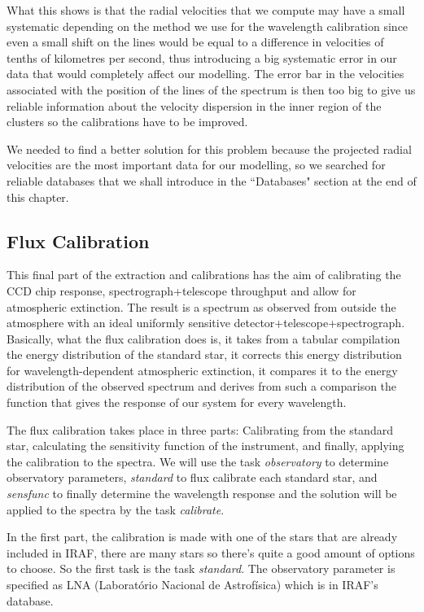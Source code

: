 What this shows is that the radial velocities that we compute may have a small systematic depending on the method we use for the wavelength calibration since even a small shift on the lines would be equal to a difference in velocities of tenths of kilometres per second, thus introducing a big systematic error in our data that would completely affect our modelling. The error bar in the velocities associated with the position of the lines of the spectrum is then too big to give us reliable information about the velocity dispersion in the inner region of the clusters so the calibrations have to be improved.

We needed to find a better solution for this problem because the projected radial velocities are the most important data for our modelling, so we searched for reliable databases that we shall introduce in the ``Databases" section at the end of this chapter. 


\subsection{Flux Calibration}

This final part of the extraction and calibrations has the aim of calibrating the CCD chip response, spectrograph+telescope throughput and allow for atmospheric extinction. The result is a spectrum as observed from outside the atmosphere with an ideal uniformly sensitive detector+telescope+spectrograph. Basically, what the flux calibration does is, it takes from a tabular compilation the energy distribution of the standard star, it corrects this energy distribution for wavelength-dependent atmospheric extinction, it compares it to the energy distribution of the observed spectrum and derives from such a comparison the function that gives the response of our system for every wavelength.

The flux calibration takes place in three parts: Calibrating from the standard star, calculating the sensitivity function of the instrument, and finally, applying the calibration to the spectra. We will use the task \textit{observatory} to determine observatory parameters, \textit{standard} to flux calibrate each standard star, and \textit{sensfunc} to finally determine the wavelength response and the solution will be applied to the spectra by the task \textit{calibrate}.

In the first part, the calibration is made with one of the stars that are already included in IRAF, there are many stars so there's quite a good amount of options to choose. So the first task is the task \textit{standard}. The observatory parameter is specified as LNA (Laborat\'orio Nacional de Astrof\'isica) which is in IRAF's database. 

